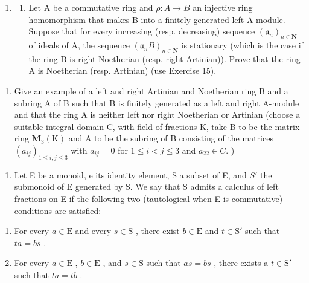 \begin{enumerate}
\def\labelenumi{\arabic{enumi})}
\setcounter{enumi}{15}
\tightlist
\item
  \begin{enumerate}
  \def\labelenumii{\alph{enumii})}
  \tightlist
  \item
    Let A be a commutative ring and \(\rho: A \to B\) an injective ring homomorphism that makes B into a finitely generated left A-module. Suppose that for every increasing (resp. decreasing) sequence \((\mathfrak{a}_{n})_{n \in \mathbf{N}}\) of ideals of A, the sequence \((\mathfrak{a}_{n}B)_{n \in \mathbf{N}}\) is stationary (which is the case if the ring B is right Noetherian (resp. right Artinian)). Prove that the ring A is Noetherian (resp. Artinian) (use Exercise 15).
  \end{enumerate}
\end{enumerate}

\begin{enumerate}
\def\labelenumi{\alph{enumi})}
\setcounter{enumi}{1}
\tightlist
\item
  Give an example of a left and right Artinian and Noetherian ring B and a subring A of B such that B is finitely generated as a left and right A-module and that the ring A is neither left nor right Noetherian or Artinian (choose a suitable integral domain C, with field of fractions K, take B to be the matrix ring \(\mathbf{M}_{3}(\mathrm{K})\) and A to be the subring of B consisting of the matrices \((a_{ij})_{1\leqslant i,j\leqslant3}\) with \(a_{ij}=0\) for \(1\leqslant i<j\leqslant3\) and \(a_{22}\in C.\) )
\end{enumerate}

\begin{enumerate}
\def\labelenumi{\arabic{enumi})}
\setcounter{enumi}{16}
\tightlist
\item
  Let E be a monoid, e its identity element, S a subset of E, and \(S'\) the submonoid of E generated by S. We say that S admits a calculus of left fractions on E if the following two (tautological when E is commutative) conditions are satisfied:
\end{enumerate}

\begin{enumerate}
\def\labelenumi{(\roman{enumi})}
\item
  For every \(a \in \mathrm{E}\) and every \(s \in \mathrm{S}\) , there exist \(b \in \mathrm{E}\) and \(t \in \mathrm{S}'\) such that \(ta = bs\) .
\item
  For every \(a \in \mathrm{E}\) , \(b \in \mathrm{E}\) , and \(s \in \mathrm{S}\) such that \(as = bs\) , there exists a \(t \in \mathrm{S}'\) such that \(ta = tb\) .
\end{enumerate}

